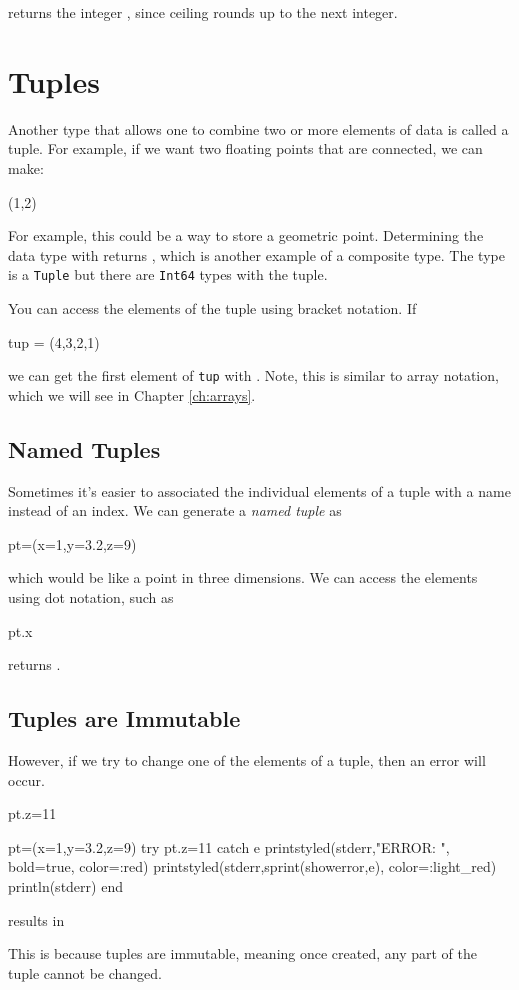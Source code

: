 returns the integer \printpythontex[verb], since ceiling rounds up to the next integer.

\section{Tuples} \label{sect:tuples}

Another type that allows one to combine two or more elements of data is called a tuple.  For example, if we want two floating points that are connected, we can make:
\begin{jlblock}[types]
(1,2)
\end{jlblock}

For example, this could be a way to store a geometric point.  Determining the data type with  returns  \printpythontex[verb], which is another example of a composite type.  The type is a \verb!Tuple! but there are \verb!Int64! types with the tuple. 

You can access the elements of the tuple using bracket notation.  If
\begin{jlblock}[types]
tup = (4,3,2,1)
\end{jlblock}
we can get the first element of \verb!tup! with .  Note, this is similar to array notation, which we will see in Chapter \ref{ch:arrays}. 

\subsection{Named Tuples}

Sometimes it's easier to associated the individual elements of a tuple with a name instead of an index.  We can generate a \emph{named tuple} as
\begin{jlblock}[types]
pt=(x=1,y=3.2,z=9)
\end{jlblock}
which would be like a point in three dimensions.  We can access the elements using dot notation, such as
\begin{jlblock}[types]
pt.x
\end{jlblock}
returns  \printpythontex[verb]. 

\subsection{Tuples are Immutable}

However, if we try to change one of the elements of a tuple, then an error will occur.  
\begin{jlverbatim}
pt.z=11
\end{jlverbatim}
\begin{jlcode}
pt=(x=1,y=3.2,z=9)
try
 pt.z=11
catch e
 printstyled(stderr,"ERROR: ", bold=true, color=:red)
 printstyled(stderr,sprint(showerror,e), color=:light_red)
 println(stderr)
end
\end{jlcode}
results in \stderrpythontex[verbatim]

This is because tuples are immutable, meaning once created, any part of the tuple cannot be changed.  
